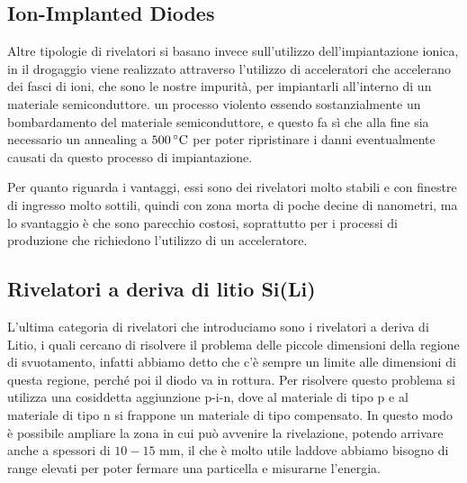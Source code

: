 \subsection{Ion-Implanted Diodes}
Altre tipologie di rivelatori si basano invece sull'utilizzo dell'impiantazione ionica, in il drogaggio viene realizzato attraverso l'utilizzo di acceleratori che accelerano dei fasci di ioni, che sono le nostre impurità, per impiantarli all'interno di un materiale semiconduttore. \E un processo violento essendo sostanzialmente un bombardamento del materiale semiconduttore, e questo fa sì che alla fine sia necessario un annealing a $500 \, \rm ^{\circ}C$ per poter ripristinare i danni eventualmente causati da questo processo di impiantazione.

Per quanto riguarda i vantaggi, essi sono dei rivelatori molto stabili e con finestre di ingresso molto sottili, quindi con zona morta di poche decine di nanometri, ma lo svantaggio è che sono parecchio costosi, soprattutto per i processi di produzione che richiedono l'utilizzo di un acceleratore. 

\subsection{Rivelatori a deriva di litio Si(Li)}
L'ultima categoria di rivelatori che introduciamo sono i rivelatori a deriva di Litio, i quali cercano di risolvere il problema delle piccole dimensioni della regione di svuotamento, infatti abbiamo detto che c'è sempre un limite alle dimensioni di questa regione, perché poi il diodo va in rottura. Per risolvere questo problema si utilizza una cosiddetta aggiunzione p-i-n, dove al materiale di tipo p e al materiale di tipo n si frappone un materiale di tipo compensato. In questo modo è possibile ampliare la zona in cui può avvenire la rivelazione, potendo arrivare anche a spessori di $10-15$ mm, il che è molto utile laddove abbiamo bisogno di range elevati per poter fermare una particella e misurarne l'energia.

